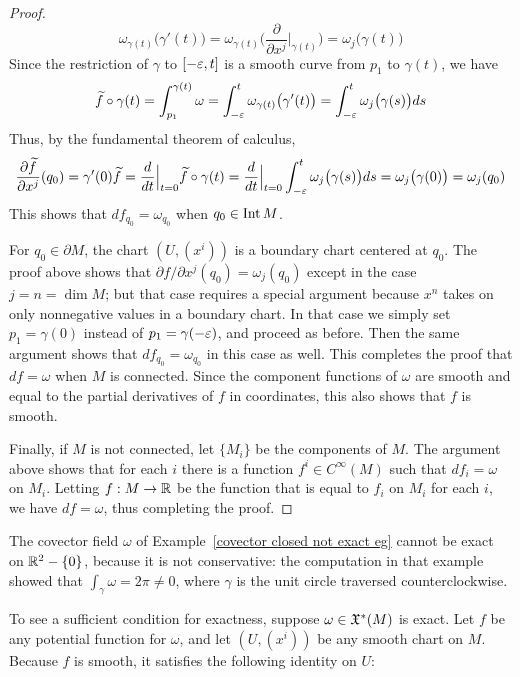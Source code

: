 \begin{proof}
\[\omega_{\gamma(t)}\big(\gamma'(t)\big)=\omega_{\gamma(t)}\Big(\frac{\partial}{\partial x^j}\Big|_{\gamma(t)}\Big)=\omega_j\big(\gamma(t)\big)\]
Since the restriction of $\gamma$ to $[-\varepsilon,t]$ is a smooth curve from $p_1$ to $\gamma(t)$, we have
\[\widetilde{f}\circ\gamma(t)=\int_{p_1}^{\gamma(t)}\omega=\int_{-\varepsilon}^{t}\omega_{\gamma(t)}\big(\gamma'(t)\big)=\int_{-\varepsilon}^{t}\omega_j\big(\gamma(s)\big)ds\]
Thus, by the fundamental theorem of calculus,
\begin{align*}
\frac{\partial\widetilde{f}}{\partial x^j}(q_0)=\gamma'(0)\widetilde{f}=\frac{d}{dt}\Big|_{t=0}\widetilde{f}\circ\gamma(t)=\frac{d}{dt}\Big|_{t=0}\int_{-\varepsilon}^{t}\omega_j\big(\gamma(s)\big)ds=\omega_j\big(\gamma(0)\big)=\omega_j(q_0)
\end{align*}
This shows that $df_{q_0}=\omega_{q_0}$ when $q_0\in\mathrm{Int}\, M$.\par
For $q_0\in\partial M$, the chart $(U,(x^i))$ is a boundary chart centered at $q_0$. The proof above shows that $\partial f/\partial x^j(q_0)=\omega_j(q_0)$ except in the case $j=n=\dim M$; but that case requires a special argument because $x^n$ takes on only nonnegative values in a boundary chart. In that case we simply set $p_1=\gamma(0)$ instead of $p_1=\gamma(-\varepsilon)$, and proceed as before. Then the same argument shows that $df_{q_0}=\omega_{q_0}$ in this case as well. This completes the proof that $df=\omega$ when $M$ is connected. Since the component functions of $\omega$ are smooth and equal to the partial derivatives of $f$ in coordinates, this also shows that $f$ is smooth.\par
Finally, if $M$ is not connected, let $\{M_i\}$ be the components of $M$. The argument above shows that for each $i$ there is a function $f^i\in C^\infty(M)$ such that $df_i=\omega$ on $M_i$. Letting $f:M\to\mathbb{R}$ be the function that is equal to $f_i$ on $M_i$ for each $i$, we have $df=\omega$, thus completing the proof.
\end{proof}
\begin{example}
The covector field $\omega$ of Example~\ref{covector closed not exact eg} cannot be exact on $\mathbb{R}^2-\{0\}$, because it is not conservative: the computation in that example showed that $\int_\gamma\omega=2\pi\neq 0$, where $\gamma$ is the unit circle traversed counterclockwise.
\end{example}
To see a sufficient condition for exactness, suppose $\omega\in\mathfrak{X}^*(M)$ is exact. Let $f$ be any potential function for $\omega$, and let $(U,(x^i))$ be any smooth chart on $M$. Because $f$ is smooth, it satisfies the following identity on $U$:
